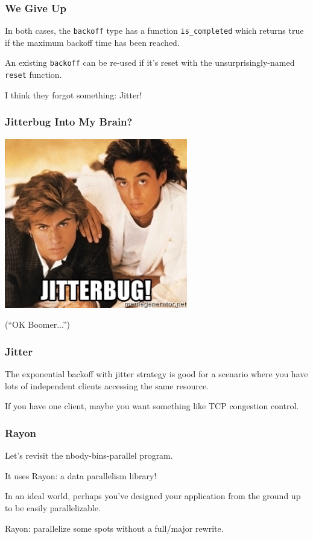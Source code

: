 \begin{frame}
\frametitle{We Give Up}

In both cases, the \texttt{backoff} type has a function \texttt{is\_completed} which returns true if the maximum backoff time has been reached.

An existing \texttt{backoff} can be re-used if it's reset with the unsurprisingly-named \texttt{reset} function.

I think they forgot something: Jitter!

\end{frame}



\begin{frame}
\frametitle{Jitterbug Into My Brain?}

\begin{center}
	\includegraphics[width=0.6\textwidth]{images/jitterbug.jpg}
\end{center}
(``OK Boomer...'')


\end{frame}


\begin{frame}
\frametitle{Jitter}


The exponential backoff with jitter strategy is good for a scenario where you have lots of independent clients accessing the same resource.

If you have one client, maybe you want something like TCP congestion control.

\end{frame}


\begin{frame}
\frametitle{Rayon}
Let's revisit the nbody-bins-parallel program.

It uses Rayon: a data parallelism library!

In an ideal world, perhaps you've designed your application from the ground up to be easily parallelizable.


Rayon: parallelize some spots without a full/major rewrite.

\end{frame}


